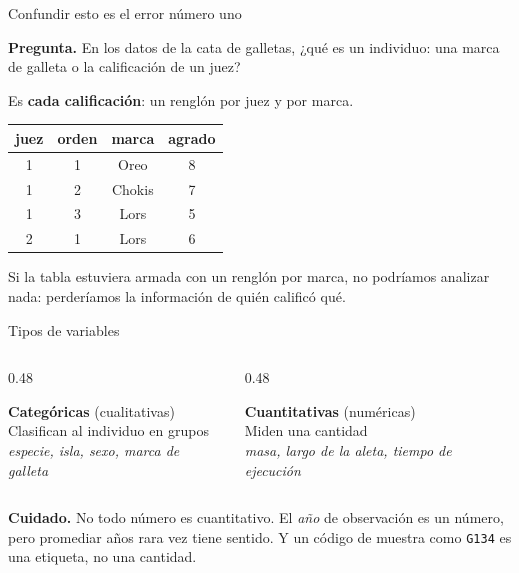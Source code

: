 \documentclass[aspectratio=169,10pt]{beamer}
\newcommand{\destaca}[1]{%
  \par\vspace{3pt}\noindent
  \colorbox{azulClaro}{%
    \parbox{\dimexpr\linewidth-2\fboxsep\relax}{\vspace{3pt}#1\vspace{3pt}}}%
  \par\vspace{3pt}}
\begin{document}
\begin{frame}{Confundir esto es el error número uno}
  \destaca{\textbf{Pregunta.} En los datos de la cata de galletas, ¿qué es un individuo:
  una marca de galleta o la calificación de un juez?}

  \vspace{0.8cm}
  \pause
  Es \textbf{cada calificación}: un renglón por juez y por marca.

  \vspace{0.4cm}
  \centering
  {\footnotesize
  \begin{tabular}{@{}cccc@{}}
    \toprule
    \textbf{juez} & \textbf{orden} & \textbf{marca} & \textbf{agrado} \\
    \midrule
    1 & 1 & Oreo & 8 \\
    1 & 2 & Chokis & 7 \\
    1 & 3 & Lors & 5 \\
    2 & 1 & Lors & 6 \\
    \bottomrule
  \end{tabular}}

  \vspace{0.5cm}
  \raggedright
  {\footnotesize Si la tabla estuviera armada con un renglón por marca, no podríamos
  analizar nada: perderíamos la información de quién calificó qué.}
\end{frame}
\begin{frame}{Tipos de variables}
  \begin{columns}[T]
    \begin{column}{0.48\textwidth}
      \destaca{\textbf{Categóricas} (cualitativas)\\[4pt]
      {\small Clasifican al individuo en grupos\\[4pt]
      \textit{especie, isla, sexo, marca de galleta}}}
    \end{column}
    \begin{column}{0.48\textwidth}
      \destaca{\textbf{Cuantitativas} (numéricas)\\[4pt]
      {\small Miden una cantidad\\[4pt]
      \textit{masa, largo de la aleta, tiempo de ejecución}}}
    \end{column}
  \end{columns}

  \vspace{0.7cm}
  \destaca{\textbf{Cuidado.} No todo número es cuantitativo. El \emph{año} de observación
  es un número, pero promediar años rara vez tiene sentido. Y un código de muestra
  como \texttt{G134} es una etiqueta, no una cantidad.}
\end{frame}
\end{document}

